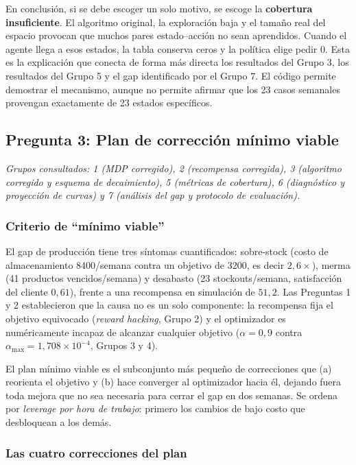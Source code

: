 \documentclass[11pt,letterpaper]{article}
\begin{document}
En conclusión, si se debe escoger un solo motivo, se escoge la
\textbf{cobertura insuficiente}. El algoritmo original, la exploración baja y el
tamaño real del espacio provocan que muchos pares estado--acción no sean
aprendidos. Cuando el agente llega a esos estados, la tabla conserva ceros y la
política elige pedir 0. Esta es la explicación que conecta de forma más directa
los resultados del Grupo 3, los resultados del Grupo 5 y el gap identificado por
el Grupo 7. El código permite demostrar el mecanismo, aunque no permite afirmar
que los 23 casos semanales provengan exactamente de 23 estados específicos.

\subsection{Pregunta 3: Plan de corrección mínimo viable}

\noindent\emph{Grupos consultados: 1 (MDP corregido), 2 (recompensa corregida),
3 (algoritmo corregido y esquema de decaimiento), 5 (métricas de cobertura),
6 (diagnóstico y proyección de curvas) y 7 (análisis del gap y protocolo de
evaluación).}

\subsubsection*{Criterio de ``mínimo viable''}

El gap de producción tiene tres síntomas cuantificados: sobre-stock (costo de
almacenamiento \num{8400}/semana contra un objetivo de \num{3200}, es decir
$2{,}6\times$), merma (41 productos vencidos/semana) y desabasto (23 stockouts/semana,
satisfacción del cliente $0{,}61$), frente a una recompensa en simulación de $51{,}2$.
Las Preguntas 1 y 2 establecieron que la causa no es un solo componente: la
recompensa fija el objetivo equivocado (\emph{reward hacking}, Grupo 2) y el
optimizador es numéricamente incapaz de alcanzar cualquier objetivo
($\alpha = 0{,}9$ contra $\alpha_{\max} = 1{,}708\times10^{-4}$, Grupos 3 y 4).

El plan mínimo viable es el subconjunto más pequeño de correcciones que (a)
reorienta el objetivo y (b) hace converger al optimizador hacia él, dejando fuera
toda mejora que no sea necesaria para cerrar el gap en dos semanas. Se ordena por
\emph{leverage por hora de trabajo}: primero los cambios de bajo costo que
desbloquean a los demás.

\subsubsection*{Las cuatro correcciones del plan}
\end{document}
